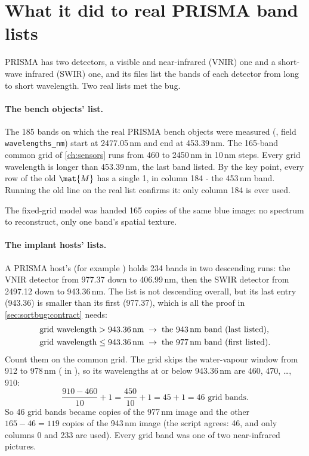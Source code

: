 \section{What it did to real PRISMA band lists}\label{sec:sortbug:prisma}

PRISMA has two detectors, a visible and near-infrared (VNIR) one and a short-wave infrared (SWIR) one, and its
files list the bands of each detector from long to short wavelength. Two real lists met the bug.

\paragraph{The bench objects' list.} The 185 bands on which the real PRISMA bench objects were measured
(, field \texttt{wavelengths\_nm}) start at 2477.05\,nm and end at
453.39\,nm. The 165-band common grid of \cref{ch:sensors} runs from 460 to
2450\,nm in 10\,nm steps. Every grid wavelength is longer than 453.39\,nm, the last band listed. By the key
point, every row of the old $\mat{M}$ has a single 1, in column 184 - the 453\,nm band. Running the old line
on the real list confirms it: only column 184 is ever used\tagC.

\begin{keypoint}
The fixed-grid model was handed 165 copies of the same blue image: no spectrum to reconstruct, only one band's
spatial texture.
\end{keypoint}

\paragraph{The implant hosts' lists.} A PRISMA host's  (for example
) holds 234 bands in two descending runs: the
VNIR detector from 977.37 down to 406.99\,nm, then the SWIR detector from 2497.12 down to
943.36\,nm. The list is not
descending overall, but its last entry (943.36) is smaller than its first (977.37), which is all the proof in
\cref{sec:sortbug:contract} needs:
\begin{align*}
\text{grid wavelength} > 943.36\,\text{nm} &\;\to\; \text{the 943\,nm band (last listed)},\\
\text{grid wavelength} \le 943.36\,\text{nm} &\;\to\; \text{the 977\,nm band (first listed)}.
\end{align*}
Count them on the common grid. The grid skips the water-vapour window from 912 to 978\,nm
( in ), so its wavelengths at or below
943.36\,nm are 460, 470, \ldots, 910:
\[
\frac{910 - 460}{10} + 1 = \frac{450}{10} + 1 = 45 + 1 = 46 \text{ grid bands.}
\]
So 46 grid bands became copies of the 977\,nm image and the other $165 - 46 = 119$ copies of the 943\,nm image
(the script agrees: 46, and only columns 0 and 233 are used\tagC). Every grid band was one of two near-infrared
pictures.

